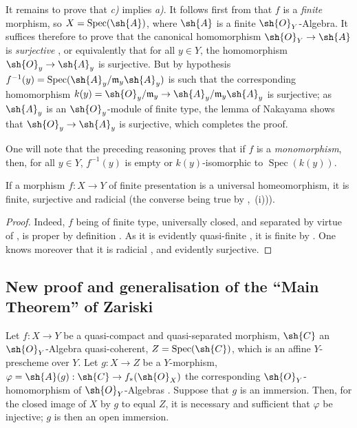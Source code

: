 It remains to prove that \emph{c)} implies \emph{a)}.
It follows first from  that $f$ is a \emph{finite} morphism, so $X=\operatorname{Spec}(\sh{A})$, where $\sh{A}$ is a finite $\sh{O}_Y$-Algebra.
It suffices therefore to prove that the canonical homomorphism $\sh{O}_Y\to\sh{A}$ is \emph{surjective} , or equivalently that for all $y\in Y$, the homomorphism $\sh{O}_y\to\sh{A}_y$ is surjective.
But by hypothesis
$f^{-1}(y)=\operatorname{Spec}(\sh{A}_y/\mathfrak{m}_y\sh{A}_y)$  is such that the corresponding homomorphism $k(y)=\sh{O}_y/\mathfrak{m}_y\to\sh{A}_y/\mathfrak{m}_y\sh{A}_y$ is surjective; as $\sh{A}_y$ is an $\sh{O}_y$-module of finite type, the lemma of Nakayama shows that $\sh{O}_y\to\sh{A}_y$ is surjective, which completes the proof.

\begin{remark}[8.11.5.1]
\label{IV.8.11.5.1}
One will note that the preceding reasoning proves that if $f$ is a \emph{monomorphism}, then, for all $y\in Y$, $f^{-1}(y)$ is empty or $k(y)$-isomorphic to $\operatorname{Spec}(k(y))$.
\end{remark}

\begin{proposition}[8.11.6]
\label{IV.8.11.6}
If a morphism $f:X\to Y$ of finite presentation is a universal homeomorphism, it is finite, surjective and radicial (the converse being true by ,~(i))).
\end{proposition}

\begin{proof}
Indeed, $f$ being of finite type, universally closed, and separated by virtue of , is proper by definition .
As it is evidently quasi-finite , it is finite by .
One knows moreover that it is radicial , and evidently surjective.
\end{proof}

\subsection{New proof and generalisation of the ``Main Theorem'' of Zariski}
\label{subsection:IV.8.12}
\label{IV.8.12}

\begin{lemma}[8.12.1]
\label{IV.8.12.1}
Let $f:X\to Y$ be a quasi-compact and quasi-separated morphism, $\sh{C}$ an $\sh{O}_Y$-Algebra quasi-coherent, $Z=\operatorname{Spec}(\sh{C})$, which is an affine $Y$-prescheme over $Y$.
Let $g:X\to Z$ be a $Y$-morphism, $\varphi=\sh{A}(g):\sh{C}\to f_*(\sh{O}_X)$ the corresponding $\sh{O}_Y$-homomorphism of $\sh{O}_Y$-Algebras .
Suppose that $g$ is an immersion.
Then, for the closed image of $X$ by $g$  to equal $Z$, it is necessary and sufficient that $\varphi$ be injective; $g$ is then an open immersion.
\end{lemma}

